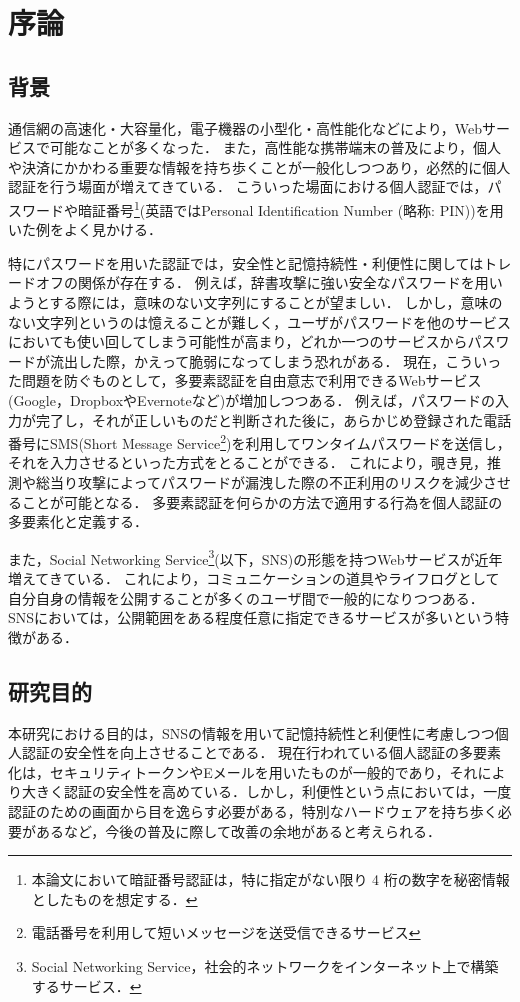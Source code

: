 \chapter{序論}\label{chap:introduction}
\section{背景}
通信網の高速化・大容量化，電子機器の小型化・高性能化などにより，Webサービスで可能なことが多くなった．
また，高性能な携帯端末の普及により，個人や決済にかかわる重要な情報を持ち歩くことが一般化しつつあり，必然的に個人認証を行う場面が増えてきている．
こういった場面における個人認証では，パスワードや暗証番号\footnote{本論文において暗証番号認証は，特に指定がない限り 4 桁の数字を秘密情報としたものを想定する．}(英語ではPersonal Identification Number (略称: PIN))を用いた例をよく見かける．

特にパスワードを用いた認証では，安全性と記憶持続性・利便性に関してはトレードオフの関係が存在する．
例えば，辞書攻撃に強い安全なパスワードを用いようとする際には，意味のない文字列にすることが望ましい．
しかし，意味のない文字列というのは憶えることが難しく，ユーザがパスワードを他のサービスにおいても使い回してしまう可能性が高まり，どれか一つのサービスからパスワードが流出した際，かえって脆弱になってしまう恐れがある．
現在，こういった問題を防ぐものとして，多要素認証を自由意志で利用できるWebサービス(Google\cite{google}，Dropbox\cite{dropbox}やEvernote\cite{evernote}など)が増加しつつある．
例えば，パスワードの入力が完了し，それが正しいものだと判断された後に，あらかじめ登録された電話番号にSMS(Short Message Service\footnote{電話番号を利用して短いメッセージを送受信できるサービス})を利用してワンタイムパスワードを送信し，それを入力させるといった方式をとることができる．
これにより，覗き見，推測や総当り攻撃によってパスワードが漏洩した際の不正利用のリスクを減少させることが可能となる．
多要素認証を何らかの方法で適用する行為を個人認証の多要素化と定義する．

また，Social Networking Service\footnote{Social Networking Service，社会的ネットワークをインターネット上で構築するサービス．}(以下，SNS)の形態を持つWebサービスが近年増えてきている．
これにより，コミュニケーションの道具やライフログとして自分自身の情報を公開することが多くのユーザ間で一般的になりつつある．
SNSにおいては，公開範囲をある程度任意に指定できるサービスが多いという特徴がある．

\section{研究目的}
本研究における目的は，SNSの情報を用いて記憶持続性と利便性に考慮しつつ個人認証の安全性を向上させることである．
現在行われている個人認証の多要素化は，セキュリティトークンやEメールを用いたものが一般的であり，それにより大きく認証の安全性を高めている．しかし，利便性という点においては，一度認証のための画面から目を逸らす必要がある，特別なハードウェアを持ち歩く必要があるなど，今後の普及に際して改善の余地があると考えられる．

